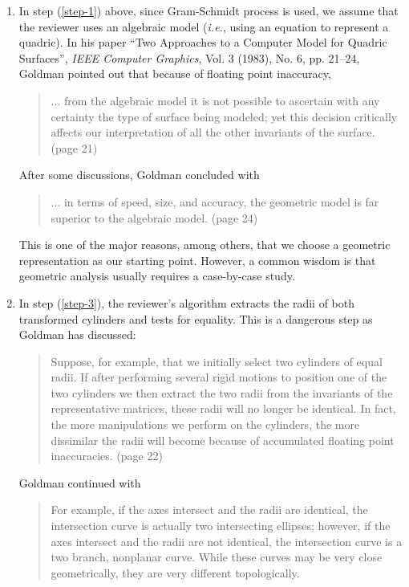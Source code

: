\begin{enumerate}
     \item In step (\ref{step-1}) above, since Gram-Schmidt process is used, we
          assume that the reviewer uses an algebraic model ({\em i.e.},
          using an equation to represent  a quadric).
          In his paper ``Two Approaches to a Computer Model for Quadric
          Surfaces'', {\em IEEE Computer Graphics}, Vol. 3 (1983), No. 6,
          pp. 21--24, Goldman pointed out that because of floating point
          inaccuracy,
          \begin{quote}
               ... from the algebraic model it is not possible to ascertain
               with any certainty the type of surface being modeled; yet this
               decision critically affects our interpretation of all the other
               invariants of the surface. (page 21)
          \end{quote}
          After some discussions, Goldman concluded with
          \begin{quote}
               ... in terms of speed, size, and accuracy, the geometric model
               is far superior to the algebraic model. (page 24)
          \end{quote}
          This is one of the major reasons, among others, that we choose
          a geometric representation as our starting point.  However, a common
          wisdom is that geometric analysis usually requires a case-by-case
          study.

     \item In step (\ref{step-3}), the reviewer's algorithm extracts the radii
          of both transformed cylinders and tests for equality.  This is a
          dangerous step as Goldman has discussed:
          \begin{quote}
               Suppose, for example, that we initially select two cylinders
               of equal radii. If after performing several rigid motions to
               position one of the two cylinders we then extract the two radii
               from the invariants of the representative matrices, these radii
               will no longer be identical.  In fact, the more manipulations we
               perform on the cylinders, the more dissimilar the radii will
               become because of accumulated floating point inaccuracies.
               (page 22)
          \end{quote}

          Goldman continued with
          \begin{quote}
               For example, if the axes intersect and the radii are identical,
               the intersection curve is actually two intersecting ellipses;
               however, if the axes intersect and the radii are not
               identical, the intersection curve is a two branch, nonplanar
               curve.  While these curves may be very close geometrically,
               they are very different topologically.
          \end{quote}


\end{enumerate}
